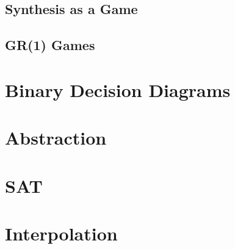 \subsection{Synthesis as a Game}

\subsection{GR(1) Games}

\section{Binary Decision Diagrams}

\section{Abstraction}

\section{SAT}

\section{Interpolation}
